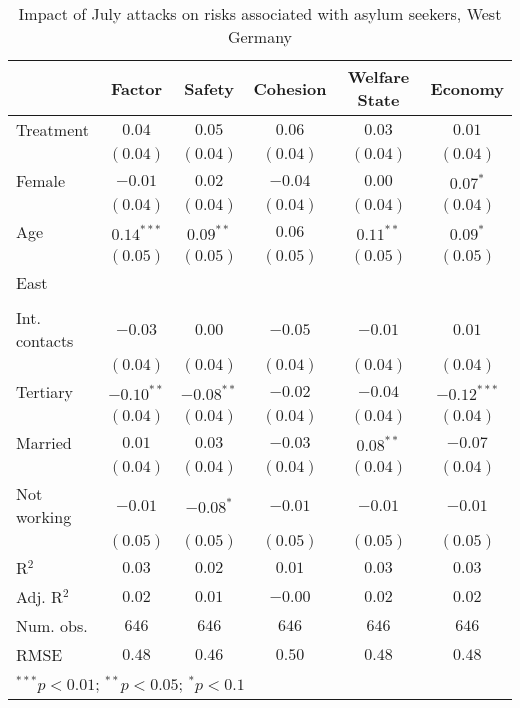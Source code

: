 
\begin{table}
\caption{Impact of July attacks on risks associated with asylum seekers, West Germany}
\begin{center}
\begin{tabular}{l c c c c c}
\toprule
 & Factor & Safety & Cohesion & Welfare State & Economy \\
\midrule
Treatment     & $0.04$       & $0.05$       & $0.06$   & $0.03$      & $0.01$        \\
              & $(0.04)$     & $(0.04)$     & $(0.04)$ & $(0.04)$    & $(0.04)$      \\
Female        & $-0.01$      & $0.02$       & $-0.04$  & $0.00$      & $0.07^{*}$    \\
              & $(0.04)$     & $(0.04)$     & $(0.04)$ & $(0.04)$    & $(0.04)$      \\
Age           & $0.14^{***}$ & $0.09^{**}$  & $0.06$   & $0.11^{**}$ & $0.09^{*}$    \\
              & $(0.05)$     & $(0.05)$     & $(0.05)$ & $(0.05)$    & $(0.05)$      \\
East          &              &              &          &             &               \\
              &              &              &          &             &               \\
Int. contacts & $-0.03$      & $0.00$       & $-0.05$  & $-0.01$     & $0.01$        \\
              & $(0.04)$     & $(0.04)$     & $(0.04)$ & $(0.04)$    & $(0.04)$      \\
Tertiary      & $-0.10^{**}$ & $-0.08^{**}$ & $-0.02$  & $-0.04$     & $-0.12^{***}$ \\
              & $(0.04)$     & $(0.04)$     & $(0.04)$ & $(0.04)$    & $(0.04)$      \\
Married       & $0.01$       & $0.03$       & $-0.03$  & $0.08^{**}$ & $-0.07$       \\
              & $(0.04)$     & $(0.04)$     & $(0.04)$ & $(0.04)$    & $(0.04)$      \\
Not working   & $-0.01$      & $-0.08^{*}$  & $-0.01$  & $-0.01$     & $-0.01$       \\
              & $(0.05)$     & $(0.05)$     & $(0.05)$ & $(0.05)$    & $(0.05)$      \\
\midrule
R$^2$         & $0.03$       & $0.02$       & $0.01$   & $0.03$      & $0.03$        \\
Adj. R$^2$    & $0.02$       & $0.01$       & $-0.00$  & $0.02$      & $0.02$        \\
Num. obs.     & $646$        & $646$        & $646$    & $646$       & $646$         \\
RMSE          & $0.48$       & $0.46$       & $0.50$   & $0.48$      & $0.48$        \\
\bottomrule
\multicolumn{6}{l}{\scriptsize{$^{***}p<0.01$; $^{**}p<0.05$; $^{*}p<0.1$}}
\end{tabular}
\label{tab_risk_west}
\end{center}
\end{table}

